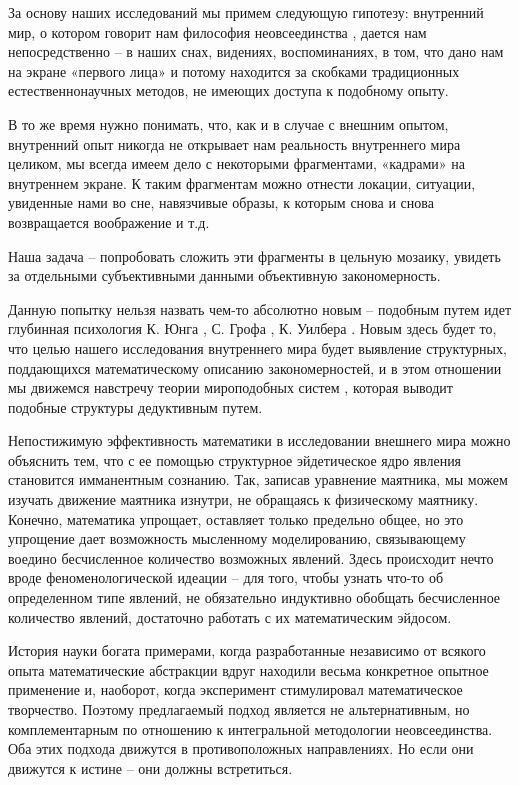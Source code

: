 За основу наших исследований мы примем следующую гипотезу: внутренний мир, о котором говорит нам философия неовсеединства \cite{moiseev1999,moiseev2024a,moiseev2010}, дается нам непосредственно – в наших снах, видениях, воспоминаниях, в том, что дано нам на экране «первого лица» и потому находится за скобками традиционных естественнонаучных методов, не имеющих доступа к подобному опыту.

В то же время нужно понимать, что, как и в случае с внешним опытом, внутренний опыт никогда не открывает нам реальность внутреннего мира целиком, мы всегда имеем дело с некоторыми фрагментами, «кадрами» на внутреннем экране. К таким фрагментам можно отнести локации, ситуации, увиденные нами во сне, навязчивые образы, к которым снова и снова возвращается воображение и т.д.

Наша задача – попробовать сложить эти фрагменты в цельную мозаику, увидеть за отдельными субъективными данными объективную закономерность.

Данную попытку нельзя назвать чем-то абсолютно новым – подобным путем идет глубинная психология К. Юнга \cite{jung1968}, С. Грофа \cite{grof1988}, К. Уилбера \cite{wilber2000}. Новым здесь будет то, что целью нашего исследования внутреннего мира будет выявление структурных, поддающихся математическому описанию закономерностей, и в этом отношении мы движемся навстречу теории мироподобных систем \cite{moiseev2022}, которая выводит подобные структуры дедуктивным путем.

Непостижимую эффективность математики в исследовании внешнего мира можно объяснить тем, что с ее помощью структурное эйдетическое ядро явления становится имманентным сознанию. Так, записав уравнение маятника, мы можем изучать движение маятника изнутри, не обращаясь к физическому маятнику. Конечно, математика упрощает, оставляет только предельно общее, но это упрощение дает возможность мысленному моделированию, связывающему воедино бесчисленное количество возможных явлений. Здесь происходит нечто вроде феноменологической идеации – для того, чтобы узнать что-то об определенном типе явлений, не обязательно индуктивно обобщать бесчисленное количество явлений, достаточно работать с их математическим эйдосом.

История науки богата примерами, когда разработанные независимо от всякого опыта математические абстракции вдруг находили весьма конкретное опытное применение и, наоборот, когда эксперимент стимулировал математическое творчество. Поэтому предлагаемый подход является не альтернативным, но комплементарным по отношению к интегральной методологии неовсеединства. Оба этих подхода движутся в противоположных направлениях. Но если они движутся к истине – они должны встретиться.

